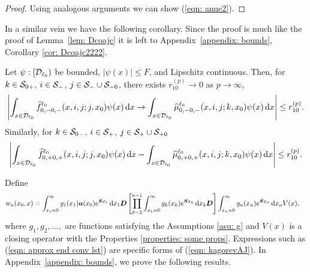 \begin{proof}
                Using analogous arguments we can show  (\ref{eqn: anue2}).
\end{proof}
In a similar vein we have the following corollary. Since the proof is much like the proof of Lemma~\ref{lem: Dcoajc} it is left to Appendix~\ref{appendix: bounds}, Corollary \ref{cor: Dcoajc2222}. 
\begin{cor}\label{cor: Dcoajc}
	Let \(\psi:[\mathcal{D}_{\ell_0})\) be bounded, \(|\psi(x)|\leq F\), and Lipschitz continuous. Then, for \(k\in\mathcal{S}_{0+}\), \(i\in\mathcal{S}_-\), \(j\in\mathcal{S}_-\cup\mathcal{S}_{-0}\), there exists \(r_{10}^{(p)}\to 0\) as \(p \to \infty\), 
	\begin{align}
		\left|\int_{x\in\mathcal{D}_{\ell_0}} \widehat f_{0,-0,-}^{\ell_0}(x,i,j;j,x_0)\psi(x)\, \mathrm{d} x  \to \int_{x\in\mathcal{D}_{\ell_0}} \widehat \mu_{0,-0,-}^{\ell_0}(x,i,j;k,x_0)\psi(x)\, \mathrm{d} x\right|\leq r_{10}^{(p)}.\label{eqn:xs}
	\end{align}
	Similarly, for \(k\in\mathcal{S}_{0-}\), \(i\in\mathcal{S}_+\), \(j\in\mathcal{S}_+\cup\mathcal{S}_{+0}\)
	\begin{align}
		\left|\int_{x\in\mathcal{D}_{\ell_0}} \widehat f_{0,+0,+}^{\ell_0}(x,i,j;j,x_0)\psi(x)\, \mathrm{d} x  - \int_{x\in\mathcal{D}_{\ell_0}} \widehat \mu_{0,+0,+}^{\ell_0}(x,i,j;k,x_0)\psi(x)\, \mathrm{d} x\right|\leq r_{10}^{(p)}.\label{eqn:!124mcds}
	\end{align}
\end{cor}

Define 
\begin{align}
		w_n(x_0,x) &= \int_{x_1=0}^\infty g_1(x_1) \boldsymbol a (x_0) e^{\boldsymbol{S}x_1}\, \mathrm{d} x_1\boldsymbol D 
            	\left[\prod_{k=2}^{n-1}\int_{x_k=0}^\infty g_k(x_k) e^{\boldsymbol{S}x_k} \, \mathrm{d} x_k \boldsymbol D\right] \int_{x_n=0}^\infty g_{n}(x_n) e^{\boldsymbol{S}x_n} \, \mathrm{d} x_n V(x), \label{eqn: kagorevAJ}
\end{align}
where \(g_1,g_2,\dots,\) are functions satisfying the Assumptions \ref{asu: g} and \(V(x)\) is a closing operator with the Properties \ref{properties: some props}. Expressions such as (\ref{eqn: approx end conv lst}) are specific forms of (\ref{eqn: kagorevAJ}). In Appendix~\ref{appendix: bounds}, we prove the following results. %

